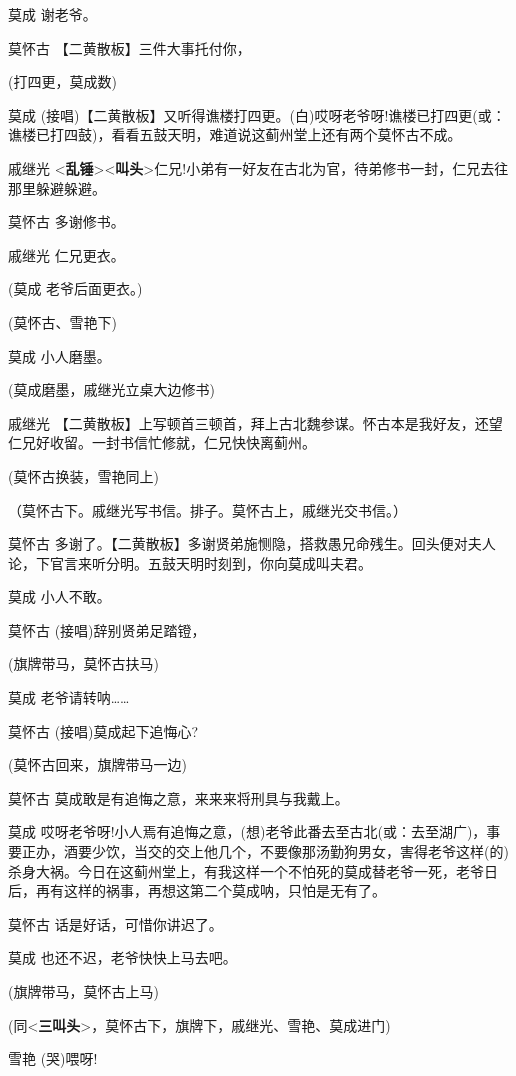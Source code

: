 莫成 谢老爷。

莫怀古 【二黄散板】三件大事托付你，

(打四更，莫成数)

莫成
(接唱)【二黄散板】又听得谯楼打四更。(白)哎呀老爷呀!谯楼已打四更(或：谯楼已打四鼓)，看看五鼓天明，难道说这蓟州堂上还有两个莫怀古不成。

戚继光
\textless{}\textbf{乱锤}\textgreater{}\textless{}\textbf{叫头}\textgreater{}仁兄!小弟有一好友在古北为官，待弟修书一封，仁兄去往那里躲避躲避。

莫怀古 多谢修书。

戚继光 仁兄更衣。

(莫成 老爷后面更衣。)

(莫怀古、雪艳下)

莫成 小人磨墨。

(莫成磨墨，戚继光立桌大边修书)

戚继光
【二黄散板】上写顿首三顿首，拜上古北魏参谋。怀古本是我好友，还望仁兄好收留。一封书信忙修就，仁兄快快离蓟州。

(莫怀古换装，雪艳同上)

（莫怀古下。戚继光写书信。排子。莫怀古上，戚继光交书信。）

莫怀古
多谢了。【二黄散板】多谢贤弟施恻隐，搭救愚兄命残生。回头便对夫人论，下官言来听分明。五鼓天明时刻到，你向莫成叫夫君。

莫成 小人不敢。

莫怀古 (接唱)辞别贤弟足踏镫，

(旗牌带马，莫怀古扶马)

莫成 老爷请转呐\ldots{}\ldots{}

莫怀古 (接唱)莫成起下追悔心?

(莫怀古回来，旗牌带马一边)

莫怀古 莫成敢是有追悔之意，来来来将刑具与我戴上。

莫成
哎呀老爷呀!小人焉有追悔之意，(想)老爷此番去至古北(或：去至湖广)，事要正办，酒要少饮，当交的交上他几个，不要像那汤勤狗男女，害得老爷这样(的)杀身大祸。今日在这蓟州堂上，有我这样一个不怕死的莫成替老爷一死，老爷日后，再有这样的祸事，再想这第二个莫成呐，只怕是无有了。

莫怀古 话是好话，可惜你讲迟了。

莫成 也还不迟，老爷快快上马去吧。

(旗牌带马，莫怀古上马)

(同\textless{}\textbf{三叫头}\textgreater{}，莫怀古下，旗牌下，戚继光、雪艳、莫成进门)

雪艳 (哭)喂呀!

